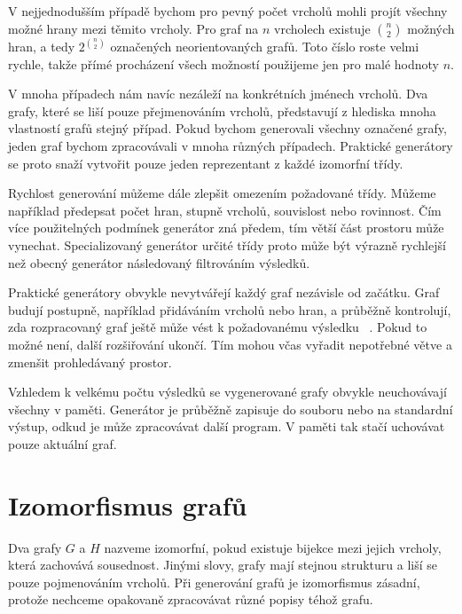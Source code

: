 V nejjednodušším případě bychom pro pevný počet vrcholů
mohli projít všechny možné hrany mezi těmito vrcholy. Pro graf na \(n\) vrcholech
existuje \(\binom{n}{2}\) možných hran, a tedy \(2^{\binom{n}{2}}\) označených
neorientovaných grafů. Toto číslo roste velmi rychle, takže přímé procházení všech
možností použijeme jen pro malé hodnoty \(n\).

V mnoha případech nám navíc nezáleží na konkrétních jménech vrcholů. Dva grafy,
které se liší pouze přejmenováním vrcholů, představují z hlediska mnoha vlastností grafů stejný 
případ.
Pokud bychom generovali všechny označené grafy, jeden graf bychom zpracovávali v mnoha
různých případech.
Praktické generátory se proto snaží vytvořit pouze jeden
reprezentant z každé izomorfní třídy.

Rychlost generování můžeme dále zlepšit omezením požadované třídy. Můžeme
například předepsat počet hran, stupně vrcholů, souvislost nebo rovinnost.
Čím více použitelných podmínek generátor zná předem, tím větší část prostoru
může vynechat. Specializovaný generátor určité třídy proto může být výrazně
rychlejší než obecný generátor následovaný filtrováním výsledků.


Praktické generátory obvykle nevytvářejí každý graf nezávisle od začátku.
Graf budují postupně, například přidáváním vrcholů nebo hran, a průběžně
kontrolují, zda rozpracovaný graf ještě může vést k požadovanému výsledku
~\cite[Section~2.2]{jooken2025computerassisted}. Pokud to možné není, další
rozšiřování ukončí. Tím mohou včas vyřadit nepotřebné větve
a zmenšit prohledávaný prostor.

Vzhledem k velkému počtu výsledků se vygenerované grafy obvykle neuchovávají
všechny v paměti. Generátor je průběžně zapisuje do souboru nebo na standardní
výstup, odkud je může zpracovávat další program. V paměti tak stačí uchovávat
pouze aktuální graf.



\section{Izomorfismus grafů}
\label{sec:graph-isomorphism}

Dva grafy \(G\) a \(H\) nazveme izomorfní, pokud existuje bijekce mezi jejich vrcholy,
která zachovává sousednost. Jinými slovy, grafy mají stejnou strukturu a liší se pouze
pojmenováním vrcholů. Při generování grafů je izomorfismus zásadní,
protože nechceme opakovaně zpracovávat různé popisy téhož grafu.

